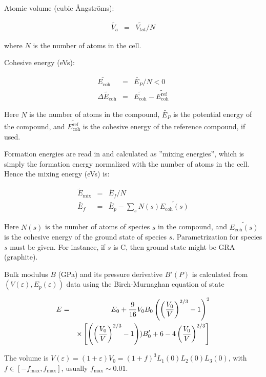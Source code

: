\documentclass[a4paper,12pt,pdftex,onecolumn]{article}
\begin{document}
Atomic volume (cubic \AA{}ngstr\"oms):

\begin{eqnarray}
\widetilde{V_a} &=& \widetilde{V_{tot}}/N
\end{eqnarray}

where $N$ is the number of atoms in the cell.

Cohesive energy (eVs):

\begin{eqnarray}
\widetilde{E_{\mathrm{coh}}} &=& \widetilde{E_P}/N < 0\\
\widetilde{\Delta E_{\mathrm{coh}}}
&=& \widetilde{E_{\mathrm{coh}}} - \widetilde{E_{\mathrm{coh}}^{\mathrm{ref}}}
\end{eqnarray}

Here $N$ is the number of atoms in the compound,
$\widetilde{E_P}$ is the potential energy of the compound, and
$\widetilde{E_{\mathrm{coh}}^{\mathrm{ref}}}$ is the cohesive energy of the reference
compound, if used.

Formation energies are read in and calculated as ''mixing energies'',
which is simply the formation energy normalized with the number of atoms
in the cell. Hence the mixing energy (eVs) is:

\begin{eqnarray}
\widetilde{E}_{\mathrm{mix}} &=& \widetilde{E_f}/N \\
\widetilde{E_f} &=& \widetilde{E_p} - \sum_s N(s) \widetilde{E_{\mathrm{coh}}(s)}
\end{eqnarray}

Here $N(s)$ is the number of atoms of species $s$ in the compound, and
$\widetilde{E_{\mathrm{coh}}(s)}$ is the cohesive energy of the ground state of species $s$.
Parametrization for species $s$ must be given.
For instance, if $s$ is C, then ground state might be GRA (graphite).


Bulk modulus $B$ (GPa) and its pressure derivative $B'(P)$ is calculated from
$(V(\varepsilon), E_p(\varepsilon))$ data using the
Birch-Murnaghan equation of state~\cite{Birch-PR71-1947,Mur44}

\begin{eqnarray}
E &=& E_0 + {9 \over 16} V_0 B_0 \left( \left({V_0 \over V}\right)^{2/3} - 1 \right)^2 \nonumber \\
  & & \times 
\left[
\left( \left({V_0 \over V}\right)^{2/3} - 1 \right)) B'_0
+ 6 - 4 \left({V_0 \over V}\right)^{2/3}
\right]
\end{eqnarray}

The volume is $V(\varepsilon) = (1 + \varepsilon) V_0
= (1+f)^3 L_1(0) L_2(0) L_3(0)$, with $f \in [-f_{\mathrm{max}}, f_{\mathrm{max}}]$, usually
$f_{\mathrm{max}} \sim 0.01$.
\end{document}
